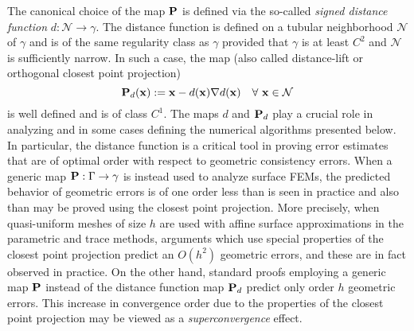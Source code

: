 The canonical choice of the map ${\bf P}$ is defined via the so-called {\it signed distance function} $d:\mathcal N \rightarrow \gamma$.  The distance function is defined on a tubular neighborhood
$\mathcal N$ of $\gamma$ and is of the same regularity class as $\gamma$ provided that $\gamma$ is at least $C^2$ and $\mathcal N$ is sufficiently narrow. In such a case, the map (also called distance-lift or orthogonal closest point projection) 
%
\begin{equation*}
{\bf P}_{d}({\bf x}) := {\bf x} - d({\bf x}) \nabla d({\bf x})  \quad
\forall~{\bf x} \in \mathcal N
\end{equation*}
is well defined and is of class $C^1$. The maps $d$ and ${\bf P}_{d}$
play a crucial role in analyzing and in some cases defining the numerical
algorithms presented below.  In particular, the distance function is a critical tool in proving error estimates that are of optimal order with respect to geometric consistency errors.  When a generic map ${\bf P}:\Gamma \rightarrow \gamma$ is instead used to analyze surface FEMs, the predicted behavior of geometric errors is of one order less than is seen in practice and also than may be proved using the closest point projection.  More precisely, when quasi-uniform meshes of size $h$ are used with affine surface approximations in the parametric and trace methods, arguments which use special properties of the closest point projection predict an $O(h^2)$ geometric errors, and these are in fact observed in practice.  On the other hand, standard proofs employing a generic map ${\bf P}$ instead of the distance function map ${\bf P}_d$ predict only order $h$ geometric errors.  This increase in convergence order due to the properties of the closest point projection may be viewed as a {\it superconvergence} effect.  

